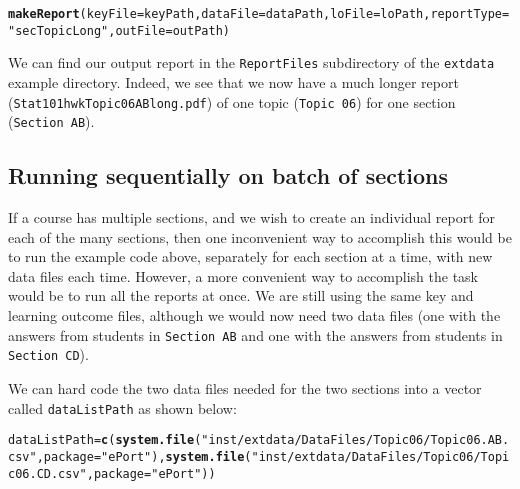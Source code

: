 \documentclass{article}\usepackage[]{graphicx}\usepackage[]{color}
\makeatletter
\newcommand{\hlstr}[1]{\textcolor[rgb]{0.192,0.494,0.8}{#1}}%
\newcommand{\hlstd}[1]{\textcolor[rgb]{0.345,0.345,0.345}{#1}}%
\newcommand{\hlkwb}[1]{\textcolor[rgb]{0.69,0.353,0.396}{#1}}%
\newcommand{\hlkwc}[1]{\textcolor[rgb]{0.333,0.667,0.333}{#1}}%
\newcommand{\hlkwd}[1]{\textcolor[rgb]{0.737,0.353,0.396}{\textbf{#1}}}%
\newenvironment{kframe}{%
 \def\at@end@of@kframe{}%
 \ifinner\ifhmode%
  \def\at@end@of@kframe{\end{minipage}}%
  \begin{minipage}{\columnwidth}%
 \fi\fi%
 \def\FrameCommand##1{\hskip\@totalleftmargin \hskip-\fboxsep
 \colorbox{shadecolor}{##1}\hskip-\fboxsep
     \hskip-\linewidth \hskip-\@totalleftmargin \hskip\columnwidth}%
 \MakeFramed {\advance\hsize-\width
   \@totalleftmargin\z@ \linewidth\hsize
   \@setminipage}}%
 {\par\unskip\endMakeFramed%
 \at@end@of@kframe}
\newenvironment{knitrout}{}{} %
\numberwithin{equation}{section} %
\makeatother
\begin{document}
\begin{knitrout}
\color{fgcolor}\begin{kframe}
\begin{alltt}
\hlkwd{makeReport}\hlstd{(}\hlkwc{keyFile}\hlstd{=keyPath,}\hlkwc{dataFile}\hlstd{=dataPath,}\hlkwc{loFile}\hlstd{=loPath,}\hlkwc{reportType}\hlstd{=}\hlstr{"secTopicLong"}\hlstd{,}\hlkwc{outFile}\hlstd{=outPath)}
\end{alltt}
\end{kframe}
\end{knitrout}

We can find our output report in the \texttt{ReportFiles} subdirectory of the \texttt{extdata} example directory. Indeed, we see that we now have a much longer report (\texttt{Stat101hwkTopic06ABlong.pdf}) of one topic (\texttt{Topic 06}) for one section (\texttt{Section AB}).

\subsection{Running sequentially on batch of sections}
\label{sec:sequential}

If a course has multiple sections, and we wish to create an individual report for each of the many sections, then one inconvenient way to accomplish this would be to run the example code above, separately for each section at a time, with new data files each time. However, a more convenient way to accomplish the task would be to run all the reports at once. We are still using the same key and learning outcome files, although we would now need two data files (one with the answers from students in \texttt{Section AB} and one with the answers from students in \texttt{Section CD}).

We can hard code the two data files needed for the two sections into a vector called \texttt{dataListPath} as shown below:

\begin{knitrout}
\color{fgcolor}\begin{kframe}
\begin{alltt}
\hlstd{dataListPath} \hlkwb{=} \hlkwd{c}\hlstd{(}\hlkwd{system.file}\hlstd{(}\hlstr{"inst/extdata/DataFiles/Topic06/Topic06.AB.csv"}\hlstd{,} \hlkwc{package}\hlstd{=}\hlstr{"ePort"}\hlstd{),} \hlkwd{system.file}\hlstd{(}\hlstr{"inst/extdata/DataFiles/Topic06/Topic06.CD.csv"}\hlstd{,} \hlkwc{package}\hlstd{=}\hlstr{"ePort"}\hlstd{))}
\end{alltt}
\end{kframe}
\end{knitrout}
\end{document}
